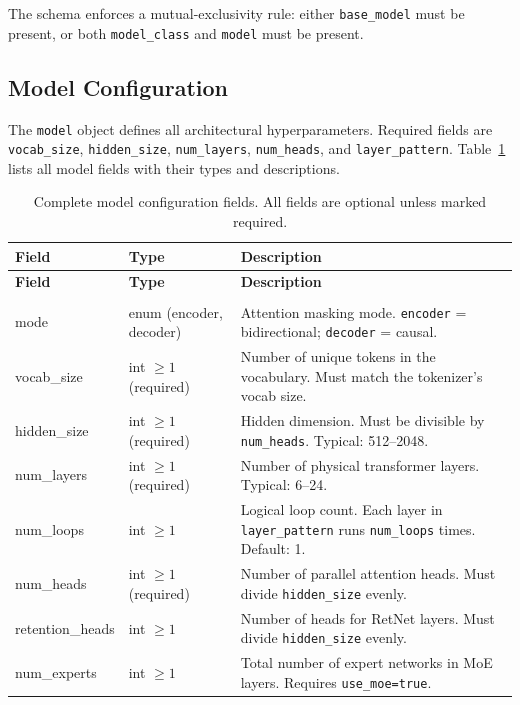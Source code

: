 The schema enforces a mutual-exclusivity rule: either \texttt{base\_model} must be present, or both \texttt{model\_class} and \texttt{model} must be present.

\subsection{Model Configuration}
\label{subsec:model-config}

The \texttt{model} object defines all architectural hyperparameters. Required fields are \texttt{vocab\_size}, \texttt{hidden\_size}, \texttt{num\_layers}, \texttt{num\_heads}, and \texttt{layer\_pattern}. Table~\ref{tab:model-fields} lists all model fields with their types and descriptions.

\begin{longtable}{>{\ttfamily}l>{\raggedright\arraybackslash}p{3.5cm}>{\raggedright\arraybackslash}p{8.5cm}}
\toprule
\textbf{Field} & \textbf{Type} & \textbf{Description} \\
\midrule
\endfirsthead
\toprule
\textbf{Field} & \textbf{Type} & \textbf{Description} \\
\midrule
\endhead
\midrule
\multicolumn{3}{r}{\textit{continued on next page}} \\
\endfoot
\bottomrule
\caption{Complete model configuration fields. All fields are optional unless marked required.}
\label{tab:model-fields}
\endlastfoot
mode & enum (encoder, decoder) & Attention masking mode. \texttt{encoder} = bidirectional; \texttt{decoder} = causal. \\
vocab\_size & int $\ge 1$ (required) & Number of unique tokens in the vocabulary. Must match the tokenizer's vocab size. \\
hidden\_size & int $\ge 1$ (required) & Hidden dimension. Must be divisible by \texttt{num\_heads}. Typical: 512--2048. \\
num\_layers & int $\ge 1$ (required) & Number of physical transformer layers. Typical: 6--24. \\
num\_loops & int $\ge 1$ & Logical loop count. Each layer in \texttt{layer\_pattern} runs \texttt{num\_loops} times. Default: 1. \\
num\_heads & int $\ge 1$ (required) & Number of parallel attention heads. Must divide \texttt{hidden\_size} evenly. \\
retention\_heads & int $\ge 1$ & Number of heads for RetNet layers. Must divide \texttt{hidden\_size} evenly. \\
num\_experts & int $\ge 1$ & Total number of expert networks in MoE layers. Requires \texttt{use\_moe=true}. \\

\end{longtable}
